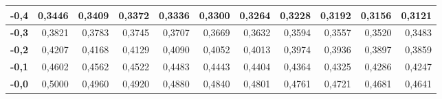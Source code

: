\documentclass[aspectratio=149,10pt,xcolor=dvipsnames,t]{beamer}
\begin{document}
\begin{frame}
{\begin{tabular}{|r||r|r|r|r|r|r|r|r|r|r|}
\hline
\textbf{-0,4}& 
0,3446& 
0,3409& 
0,3372& 
0,3336& 
0,3300& 
0,3264& 
0,3228& 
0,3192& 
0,3156& 
0,3121 \\
\hline
\textbf{-0,3}& 
0,3821& 
0,3783& 
0,3745& 
0,3707& 
0,3669& 
0,3632& 
0,3594& 
0,3557& 
0,3520& 
0,3483 \\
\hline
\textbf{-0,2}& 
0,4207& 
0,4168& 
0,4129& 
0,4090& 
0,4052& 
0,4013& 
0,3974& 
0,3936& 
0,3897& 
0,3859 \\
\hline
\textbf{-0,1}& 
0,4602& 
0,4562& 
0,4522& 
0,4483& 
0,4443& 
0,4404& 
0,4364& 
0,4325& 
0,4286& 
0,4247 \\
\hline
\textbf{-0,0}&
0,5000&
0,4960&
0,4920&
0,4880&
0,4840&
0,4801&
0,4761&
0,4721&
0,4681&
0,4641\\
\hline
\end{tabular}
}
\end{frame}
\end{document}
